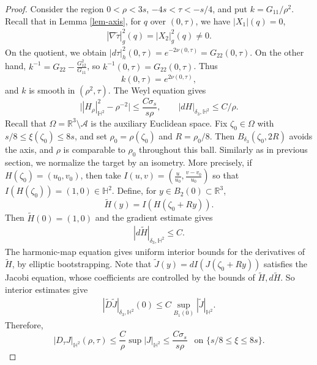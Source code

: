 \documentclass[letterpaper]{amsart}
\theoremstyle{definition}
\theoremstyle{remark}
\begin{document}
\begin{proof}
Consider the region $0<\rho<3s$, $-4s<\tau<-s/4$, and put
$k=G_{11}/\rho^2$. Recall that in Lemma \ref{lem-axis}, for $q$ over $(0, \tau )$, we have $|X_1|(q) =0$,
\begin{align*}
	|\nabla \tilde{\tau }|^2_g(q) = |X_2|^2_g(q) \neq 0.
\end{align*} 
On the quotient, we obtain $|d \tau |^2_{h}( 0, \tau ) = e ^{-2 \nu (0, \tau )} = G_{22}(0, \tau )$. On the other hand, $k ^{-1} = G_{22} - \frac{G_{12}^2}{G_{11}}$, so $k ^{-1}(0, \tau ) = G_{22}(0, \tau )$. 
Thus
\[
 k(0,\tau)=e^{2\nu(0,\tau)},
\]
and $k$ is smooth in $(\rho^2,\tau)$. The Weyl equation gives
\[
 \bigl||H_\rho|_{\mathbb H^2}^2-\rho^{-2}\bigr|
 \le\frac{C\sigma_s}{s\rho},\qquad
 |dH|_{\delta_3,\mathbb H^2}\le C/\rho.
\]
Recall that $\Omega = \mathbb{R}^3 \setminus \mathcal{A}$  is the auxiliary Euclidean space. Fix $\zeta_0\in\Omega$ with $s/8\le\xi(\zeta_0)\le8s$, and set $\rho_0=\rho(\zeta_0)$ and $R=\rho_0/8$. Then $B_{\delta_3}(\zeta_0,2R)$ avoids the axis, and $\rho$ is comparable to $\rho_0$ throughout this ball. Similarly as in previous section, we normalize the target by an isometry. More precisely, if $H(\zeta _0) = (u_0, v_0)$, then take $I(u, v) = \left( \frac{u}{u_0}, \frac{v-v_0}{u_0} \right) $ so that $I(H(\zeta _0) ) = (1,0) \in \mathbb{H}^2$. Define, for $y \in B_2(0) \subset \mathbb{R}^3$, 
$$\tilde{H}(y) = I(H(\zeta _0 + R y) ).$$ 
Then $\tilde H(0)=(1,0)$ and the gradient estimate gives
\begin{align*}
	|d \tilde{H}|_{\delta _3, \mathbb{H}^2} \leq C.
\end{align*} 
The harmonic-map equation gives uniform interior bounds for the derivatives of $\tilde{H}$, by elliptic bootstrapping. Note that $\tilde{J}(y) = d I (J(\zeta _0 + R y) )$ satisfies the Jacobi equation, whose coefficients are controlled by the bounds of $\tilde{H}, d \tilde{H}$. So interior estimates give
\begin{align*}
	|\tilde{D} \tilde{J}|_{\delta _3,\mathbb{H}^2}(0) \leq C \sup_{B_1(0)} |\tilde{J}|_{\mathbb{H}^2}. 
\end{align*} 
Therefore,
\begin{equation}\label{notes-J-derivative}
 |D_\tau J|_{\mathbb H^2}(\rho , \tau ) \le \frac{C}{\rho}\sup|J|_{\mathbb H^2}
 \le\frac{C\sigma_s}{s\rho} \ \ \text{ on } \{s /8 \leq \xi \leq 8 s\}.
\end{equation}


\end{proof}
\end{document}
